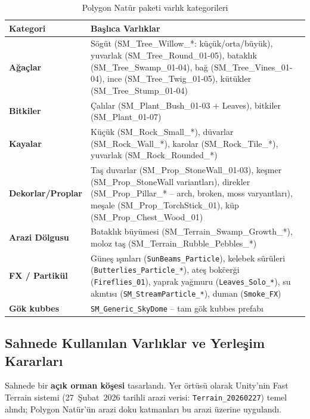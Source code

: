 \documentclass[11pt,a4paper]{article}
\begin{document}
\begin{table}[H]
\centering
\caption{Polygon Nat\"ur paketi varlık kategorileri}
\label{tab:polygon}
\renewcommand{\arraystretch}{1.2}
\begin{tabularx}{\textwidth}{lX}
\toprule
\textbf{Kategori} & \textbf{Ba\c{s}l{\i}ca Varlıklar} \\
\midrule
\textbf{A\u{g}a\c{c}lar} &
S\"og\"ut (SM\_Tree\_Willow\_*: k\"u\c{c}\"uk/orta/b\"uy\"uk),
yuvarlak (SM\_Tree\_Round\_01-05), bataklık (SM\_Tree\_Swamp\_01-04),
ba\u{g} (SM\_Tree\_Vines\_01-04), ince (SM\_Tree\_Twig\_01-05),
k\"ut\"ukler (SM\_Tree\_Stump\_01-04) \\
\textbf{Bitkiler} &
\c{C}al{\i}lar (SM\_Plant\_Bush\_01-03 + Leaves),
bitkiler (SM\_Plant\_01-07) \\
\textbf{Kayalar} &
Küçük (SM\_Rock\_Small\_*), d\"uvarlar (SM\_Rock\_Wall\_*),
karolar (SM\_Rock\_Tile\_*), yuvarlak (SM\_Rock\_Rounded\_*) \\
\textbf{Dekorlar/Proplar} &
Ta\c{s} duvarlar (SM\_Prop\_StoneWall\_01-03),
ke\c{s}mer (SM\_Prop\_StoneWall variantlar{\i}),
direkler (SM\_Prop\_Pillar\_* -- arch, broken, moss varyantlar{\i}),
me\c{s}ale (SM\_Prop\_TorchStick\_01),
k\"up (SM\_Prop\_Chest\_Wood\_01) \\
\textbf{Arazi D\"olgusu} &
Bataklık b\"uy\"umesi (SM\_Terrain\_Swamp\_Growth\_*),
moloz taş (SM\_Terrain\_Rubble\_Pebbles\_*) \\
\textbf{FX / Partikül} &
G\"une\c{s} {\i}\c{s}{\i}nlar{\i} (\texttt{SunBeams\_Particle}),
kelebek s\"ur\"uleri (\texttt{Butterlies\_Particle\_*}),
ate\c{s} bok\"cer\u{g}i (\texttt{Fireflies\_01}),
yaprak ya\u{g}muru (\texttt{Leaves\_Solo\_*}),
su ak{\i}nt{\i}s{\i} (\texttt{SM\_StreamParticle\_*}),
duman (\texttt{Smoke\_FX}) \\
\textbf{G\"ok kubbes} &
\texttt{SM\_Generic\_SkyDome} -- tam g\"ok kubbes prefab{\i} \\
\bottomrule
\end{tabularx}
\end{table}

\subsection{Sahnede Kullan{\i}lan Varlıklar ve Yerle\c{s}im Kararları}

Sahnede bir \textbf{a\c{c}{\i}k orman k\"o\c{s}esi} tasarland{\i}.
Yer \"ort\"us\"u olarak Unity'nin Fast Terrain sistemi
(27~Şubat~2026 tarihli arazi verisi: \texttt{Terrain\_20260227}) temel
al{\i}nd{\i}; Polygon Nat\"ur'\"un arazi doku katmanlar{\i} bu arazi
\"uzerine uyguland{\i}.
\end{document}
